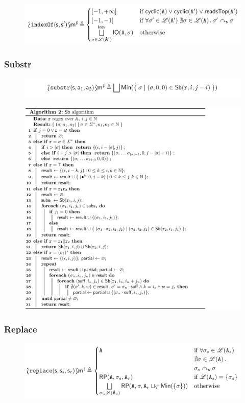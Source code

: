 \begin{figure}[H]
\includegraphics[width=\textwidth]{images/tarsis-indexOf.png}\hfill
\end{figure}

\newpage
\subsubsection*{Substr}
\begin{figure}[H]
\includegraphics[width=\textwidth]{images/tarsis-substr.png}\hfill
\end{figure}

\begin{figure}[H]
\includegraphics[width=\textwidth]{images/tarsis-SB-algo.png}\hfill
\end{figure}


\newpage
\subsubsection*{Replace}
\begin{figure}[H]
\includegraphics[width=\textwidth]{images/tarsis-replace.png}\hfill
\end{figure}

